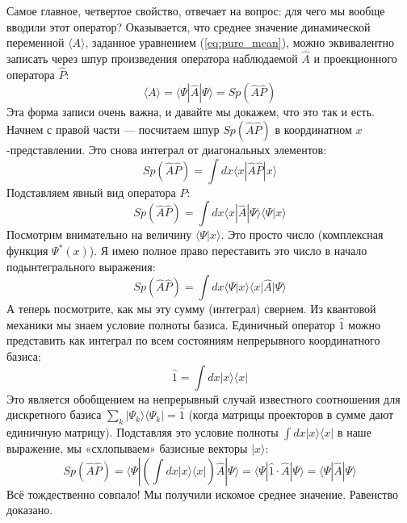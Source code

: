 \documentclass[../general/general]{subfiles}
\begin{document}
Самое главное, четвертое свойство, отвечает на вопрос: для чего мы вообще вводили этот оператор? Оказывается, что среднее значение динамической переменной $\langle A \rangle$, заданное уравнением (\ref{eq:pure_mean}), можно эквивалентно записать через шпур произведения оператора наблюдаемой $\hat{A}$ и проекционного оператора $\hat{P}$:
\begin{equation}
    \langle A \rangle = \langle \Psi | \hat{A} | \Psi \rangle = Sp(\hat{A}\hat{P}) \label{eq:trace_mean}
\end{equation}
Эта форма записи очень важна, и давайте мы докажем, что это так и есть. Начнем с правой части — посчитаем шпур $Sp(\hat{A}\hat{P})$ в координатном $x$-представлении. Это снова интеграл от диагональных элементов:
\begin{equation}
    Sp(\hat{A}\hat{P}) = \int dx \langle x | \hat{A}\hat{P} | x \rangle
\end{equation}
Подставляем явный вид оператора $\hat{P}$:
\begin{equation}
    Sp(\hat{A}\hat{P}) = \int dx \langle x | \hat{A} | \Psi \rangle \langle \Psi | x \rangle
\end{equation}
Посмотрим внимательно на величину $\langle \Psi | x \rangle$. Это просто число (комплексная функция $\Psi^*(x)$). Я имею полное право переставить это число в начало подынтегрального выражения:
\begin{equation}
    Sp(\hat{A}\hat{P}) = \int dx \langle \Psi | x \rangle \langle x | \hat{A} | \Psi \rangle
\end{equation}
А теперь посмотрите, как мы эту сумму (интеграл) свернем. Из квантовой механики мы знаем условие полноты базиса. Единичный оператор $\hat{1}$ можно представить как интеграл по всем состояниям непрерывного координатного базиса:
\begin{equation}
    \hat{1} = \int dx | x \rangle \langle x |
\end{equation}
Это является обобщением на непрерывный случай известного соотношения для дискретного базиса $\sum_k |\Psi_k\rangle\langle\Psi_k| = \hat{1}$ (когда матрицы проекторов в сумме дают единичную матрицу). Подставляя это условие полноты $\int dx | x \rangle \langle x |$ в наше выражение, мы «схлопываем» базисные векторы $|x\rangle$:
\begin{equation}
    Sp(\hat{A}\hat{P}) = \langle \Psi | \left( \int dx | x \rangle \langle x | \right) \hat{A} | \Psi \rangle = \langle \Psi | \hat{1} \cdot \hat{A} | \Psi \rangle = \langle \Psi | \hat{A} | \Psi \rangle
\end{equation}
Всё тождественно совпало! Мы получили искомое среднее значение. Равенство доказано.
\end{document}

